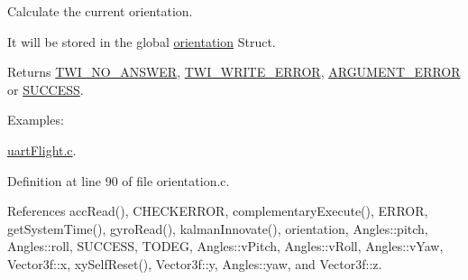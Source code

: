 Calculate the current orientation. 

It will be stored in the global \hyperlink{group__orientation_gacd4a2942520b68691db5aebde4e537a4}{orientation} Struct. \begin{DoxyReturn}{Returns}
\hyperlink{group__error_gga2c3e4bb40f36b262a5214e2da2bca9c5a04d5943ba652af2205c88b247e0c659c}{T\-W\-I\-\_\-\-N\-O\-\_\-\-A\-N\-S\-W\-E\-R}, \hyperlink{group__error_gga2c3e4bb40f36b262a5214e2da2bca9c5ac0e3b3463dcaf220e54794b4711708c9}{T\-W\-I\-\_\-\-W\-R\-I\-T\-E\-\_\-\-E\-R\-R\-O\-R}, \hyperlink{group__error_gga2c3e4bb40f36b262a5214e2da2bca9c5a49ccf277a69dd938c591928aa27c66cc}{A\-R\-G\-U\-M\-E\-N\-T\-\_\-\-E\-R\-R\-O\-R} or \hyperlink{group__error_gga2c3e4bb40f36b262a5214e2da2bca9c5ac7f69f7c9e5aea9b8f54cf02870e2bf8}{S\-U\-C\-C\-E\-S\-S}. 
\end{DoxyReturn}
\begin{Desc}
\item[Examples\-: ]\par
\hyperlink{uart_flight_8c-example}{uart\-Flight.\-c}.\end{Desc}


Definition at line 90 of file orientation.\-c.



References acc\-Read(), C\-H\-E\-C\-K\-E\-R\-R\-O\-R, complementary\-Execute(), E\-R\-R\-O\-R, get\-System\-Time(), gyro\-Read(), kalman\-Innovate(), orientation, Angles\-::pitch, Angles\-::roll, S\-U\-C\-C\-E\-S\-S, T\-O\-D\-E\-G, Angles\-::v\-Pitch, Angles\-::v\-Roll, Angles\-::v\-Yaw, Vector3f\-::x, xy\-Self\-Reset(), Vector3f\-::y, Angles\-::yaw, and Vector3f\-::z.


